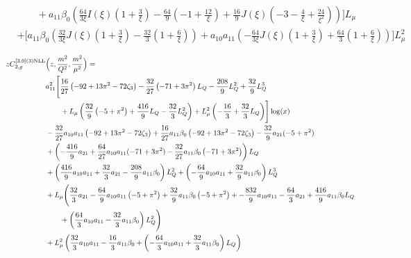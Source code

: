 \documentclass[a4paper]{article}
\begin{document}
\begin{equation}
\begin{split}
		& \qquad + a_{11} \beta_0 \left(\frac{64}{3\xi} I(\xi) \left(1 + \frac{3}{\xi}\right) - \frac{64}{9} \left(-1 + \frac{12}{\xi}\right) + \frac{16}{9} J(\xi) \left(-3 - \frac{4}{\xi} + \frac{24}{\xi^2}\right)\right)\Biggr] L_\mu \\
		& + \Biggl[ a_{11} \beta_0 \left( \frac{32}{3\xi} J(\xi) \left(1 + \frac{3}{\xi}\right) - \frac{32}{3} \left(1 + \frac{6}{\xi}\right) \right)
		+ a_{10} a_{11} \left(-\frac{64}{3\xi} J(\xi) \left(1 + \frac{3}{\xi}\right) + \frac{64}{3} \left(1 + \frac{6}{\xi}\right) \right) \Biggr] L_\mu^2
	\end{split}
\end{equation}

\begin{equation}
	\begin{split}
		z C_{2,g}^{[3, 0](3) \rm NLL}&\Bigl(z,\frac{m^2}{Q^2},\frac{m^2}{\mu^2}\Bigr)= \\
		& a_{11}^2 \Biggl[\frac{16}{27} \left(-92 + 13 \pi^2 - 72 \zeta_3\right) -\frac{32}{27} \left(-71 + 3 \pi^2\right) L_Q - \frac{208}{9} L_Q^2 + \frac{32}{9} L_Q^3  \\
		& \qquad + L_\mu \left(\frac{32}{9} \left(-5 + \pi^2\right) + \frac{416}{9} L_Q - \frac{32}{3} L_Q^2 \right) + L_\mu^2 \left(-\frac{16}{3} + \frac{32}{3} L_Q\right)\Biggr] \log(x) \\
		& - \frac{32}{27} a_{10} a_{11} \left(-92 + 13 \pi^2 - 72 \zeta_3\right) + \frac{16}{27} a_{11} \beta_0 \left(-92 + 13 \pi^2 - 72 \zeta_3\right) -\frac{32}{9} a_{21} (-5 + \pi^2)\\
		& + \left(-\frac{416}{9} a_{21} + \frac{64}{27} a_{10} a_{11} (-71 + 3 \pi^2) - \frac{32}{27} a_{11} \beta_0 \left(-71 + 3 \pi^2\right)\right) L_Q \\
		& + \left( \frac{416}{9} a_{10} a_{11} + \frac{32}{3} a_{21} - \frac{208}{9} a_{11} \beta_0 \right) L_Q^2 + \left(-\frac{64}{9} a_{10} a_{11} + \frac{32}{9} a_{11} \beta_0 \right) L_Q^3 \\
		& + L_\mu \Biggl( \frac{32}{3} a_{21} - \frac{64}{9} a_{10} a_{11} \left(-5 + \pi^2 \right) + \frac{32}{9} a_{11} \beta_0 \left(-5 + \pi^2\right) + -\frac{832}{9} a_{10} a_{11} - \frac{64}{3} a_{21} + \frac{416}{9} a_{11} \beta_0 L_Q \\
		& \qquad + \left( \frac{64}{3} a_{10} a_{11} - \frac{32}{3} a_{11} \beta_0\right) L_Q^2\Biggr) \\
		& + L_\mu^2 \left( \frac{32}{3} a_{10} a_{11} - \frac{16}{3} a_{11} \beta_0 + \left(-\frac{64}{3} a_{10} a_{11} + \frac{32}{3} a_{11} \beta_0 \right) L_Q \right)
	\end{split}
\end{equation}
\end{document}
